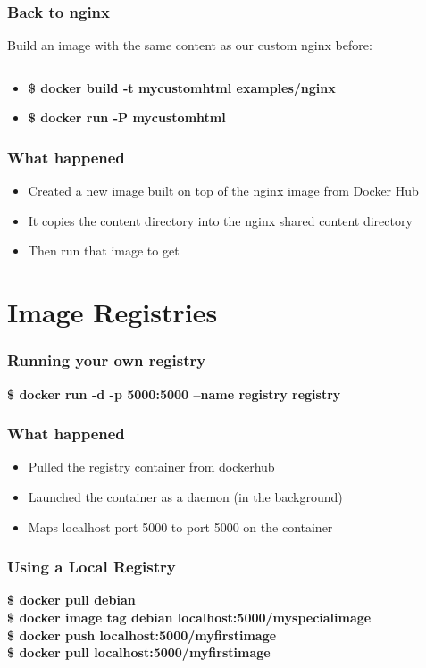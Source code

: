 \documentclass[aspectratio=169,11pt,hyperref={colorlinks=true}]{beamer}
\begin{document}
\begin{frame}
    \frametitle{Back to nginx}
    Build an image with the same content as our custom nginx before:
    \inputminted[fontsize=\scriptsize,breaklines,linenos,frame=single]{dockerfile}{examples/nginx/Dockerfile}
    \begin{itemize}
        \item \textbf{\$ docker build -t mycustomhtml examples/nginx}
        \item \textbf{\$ docker run -P mycustomhtml}
    \end{itemize}
\end{frame}

\begin{frame}
    \frametitle{What happened}
    \begin{itemize}
        \item Created a new image built on top of the nginx image from Docker Hub
        \item It copies the content directory into the nginx shared content directory
        \item Then run that image to get
    \end{itemize}

\end{frame}


\section{Image Registries}
\begin{frame}
    \frametitle{Running your own registry}
    \textbf{\$ docker run -d -p 5000:5000 --name registry registry}
\end{frame}

\begin{frame}
    \frametitle{What happened}
    \begin{itemize}
        \item Pulled the registry container from dockerhub
        \item Launched the container as a daemon (in the background)
        \item Maps localhost port 5000 to port 5000 on the container
    \end{itemize}
\end{frame}

\begin{frame}
    \frametitle{Using a Local Registry}
    \textbf{\$ docker pull debian} \\
    \textbf{\$ docker image tag debian localhost:5000/myspecialimage} \\
    \textbf{\$ docker push localhost:5000/myfirstimage} \\
    \textbf{\$ docker pull localhost:5000/myfirstimage} 
\end{frame}
\end{document}
